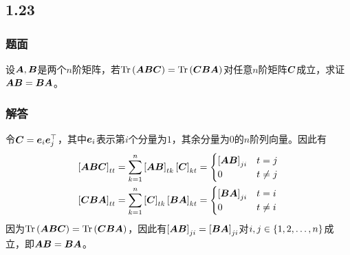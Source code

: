 \documentclass[9pt,xcolor=svgnames]{beamer} %
\begin{document}
\subsection*{1.23}
\begin{frame}
    \frametitle{题面}
    设\(\mata,\matb\)是两个\(n\)阶矩阵，若\(\trace{\mata\matb\matc}=\trace{\matc\matb\mata}\)对任意\(n\)阶矩阵\(\matc\)成立，求证\(\mata\matb=\matb\mata\)。
\end{frame}
\begin{frame}
    \frametitle{解答}
    令\(\matc=\vece_i\vece_j^\top\)，其中\(\vece_i\)表示第\(i\)个分量为\(1\)，其余分量为\(0\)的\(n\)阶列向量。因此有
    \begin{align*}
        \mat{\mata\matb\matc}_{tt} & =\sum_{k=1}^n\mat{\mata\matb}_{tk}\mat{\matc}_{kt}=
        \begin{cases}
            \mat{\mata\matb}_{ji} & t=j     \\
            0                     & t\neq j
        \end{cases}                                                  \\
        \mat{\matc\matb\mata}_{tt} & =\sum_{k=1}^n\mat{\matc}_{tk}\mat{\matb\mata}_{kt}=
        \begin{cases}
            \mat{\matb\mata}_{ji} & t=i     \\
            0                     & t\neq i
        \end{cases}
    \end{align*}
    因为\(\trace{\mata\matb\matc}=\trace{\matc\matb\mata}\)，因此有\(\mat{\mata\matb}_{ji}=\mat{\matb\mata}_{ji}\)对\(i,j\in\setof{1,2,\dots,n}\)成立，即\(\mata\matb=\matb\mata\)。
\end{frame}
\end{document}
